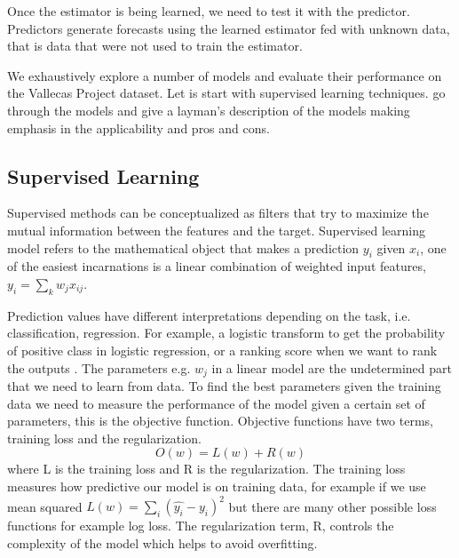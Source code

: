 \documentclass[11pt]{article}
\theoremstyle{definition}
\theoremstyle{remark}
\begin{document}
{Once the estimator is being learned, we need to test it with the predictor. Predictors generate forecasts using the learned estimator fed with unknown  data, that is data that were not used to train the estimator.

We exhaustively explore a number of models and evaluate their performance on the Vallecas Project dataset. Let is start with supervised learning techniques.
go through the models and give a layman's description of the models making emphasis in the applicability and pros and cons.

\subsection{Supervised Learning}
\label{sse:sup}
Supervised methods can be conceptualized as filters that try to maximize the mutual information between the features and the target.
Supervised learning model refers to the mathematical object that makes a prediction $y_i$ given $x_i$, one of the easiest incarnations is a linear combination of weighted input features, $y_i = \sum_k w_j x_{ij}$. 

Prediction values have different interpretations depending on the task, i.e. classification, regression. For example, a logistic transform to get the probability of positive class in logistic regression, or a ranking score when we want to rank the outputs \cite{patania2017topological}.
The parameters e.g. $w_j$ in a linear model are the undetermined part that we need to learn from data. To find the best parameters given the training data we need to measure the performance of the model given a certain set of parameters, this is the objective function. Objective functions have two terms, training loss and the regularization.
\begin{equation}
O(w) = L(w) + R(w)
\end{equation}
where L is the training loss and R is the regularization. The training loss measures how predictive our model is on training data, for example if we use mean squared $L(w) = \sum_i (\hat{y_i} - y_i)^2$ but there are many other possible loss functions for example log loss.
The regularization term, R, controls the complexity of the model which helps to avoid overfitting.

}
\end{document}
